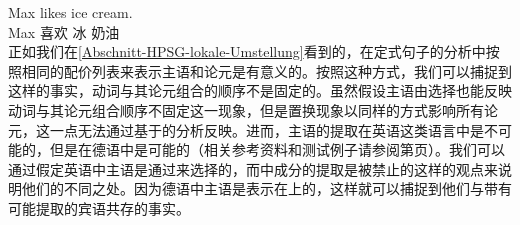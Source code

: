 \ea
\gll Max likes ice cream.\\
Max 喜欢 冰 奶油\\
\z
正如我们在\ref{Abschnitt-HPSG-lokale-Umstellung}看到的，在定式句子的分析中按照相同的配价列表来表示主语和论元是有意义的。按照这种方式，我们可以捕捉到这样的事实，动词与其论元组合的顺序不是固定的。虽然假设主语由\sprc 选择也能反映动词与其论元组合顺序不固定这一现象，但是置换现象以同样的方式影响所有论元，这一点无法通过基于\sprc 的分析反映。进而，主语的提取在英语这类语言中是不可能的，但是在德语中是可能的（相关参考资料和测试例子请参阅第\pageref{page-extraction-out-of-subjects}页）。我们可以通过假定英语中主语是通过\sprc 来选择的，而\sprlc 中成分的提取是被禁止的这样的观点来说明他们的不同之处。因为德语中主语是表示在\compslc 上的，这样就可以捕捉到他们与带有可能提取的宾语共存的事实。

